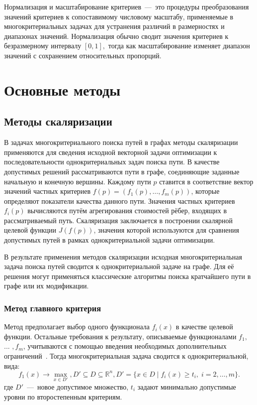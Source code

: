 Нормализация и масштабирование критериев~---~это процедуры преобразования значений критериев к сопоставимому числовому масштабу, применяемые в многокритериальных задачах для устранения различий в размерностях и диапазонах значений. Нормализация обычно сводит значения критериев к безразмерному интервалу
\(
[0,1],
\)
тогда как масштабирование изменяет диапазон значений с сохранением относительных пропорций. 


\section{Основные методы}

\subsection{Методы скаляризации}

В задачах многокритериального поиска путей в графах методы скаляризации
применяются для сведения исходной векторной задачи оптимизации к
последовательности однокритериальных задач поиска пути. В качестве
допустимых решений рассматриваются пути в графе, соединяющие заданные
начальную и конечную вершины. Каждому пути $p$ ставится в соответствие
вектор значений частных критериев
$f(p) = (f_1(p), \ldots, f_m(p))$,
которые определяют показатели качества данного пути. Значения частных критериев $f_i(p)$ вычисляются путём агрегирования
стоимостей рёбер, входящих в рассматриваемый путь. Скаляризация заключается
в построении скалярной целевой функции $J(f(p))$, значения которой
используются для сравнения допустимых путей в рамках однокритериальной
задачи оптимизации.

В результате применения методов скаляризации исходная многокритериальная задача поиска путей сводится к однокритериальной задаче на графе. Для её
решения могут применяться классические алгоритмы поиска кратчайшего пути в графе или их модификации.

\subsubsection{Метод главного критерия}

Метод предполагает выбор одного функционала \(f_i(x)\) в качестве целевой функции. Остальные требования к результату, описываемые функционалами \(f_1,\) ... \(,f_m\),
учитываются с помощью введения необходимых дополнительных ограничений~\cite{avansky2007problems}. Тогда многокритериальная задача сводится к однокритериальной, вида:
\begin{equation}
	f_1(x) \to \max_{x \in D'},
	D' \subseteq D \subseteq \mathbb{R}^n, 
	D' = \{x \in D \mid f_i(x) \geqslant t_i,\; i = 2, \ldots, m\}.
\end{equation}
где \(D'\)~---~новое допустимое множество, \(t_i\) задают минимально допустимые уровни по второстепенным критериям. 

